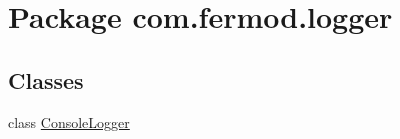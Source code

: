 \hypertarget{namespacecom_1_1fermod_1_1logger}{}\section{Package com.\+fermod.\+logger}
\label{namespacecom_1_1fermod_1_1logger}
\subsection*{Classes}
\begin{DoxyCompactItemize}
\item 
class \mbox{\hyperlink{classcom_1_1fermod_1_1logger_1_1ConsoleLogger}{Console\+Logger}}
\end{DoxyCompactItemize}
